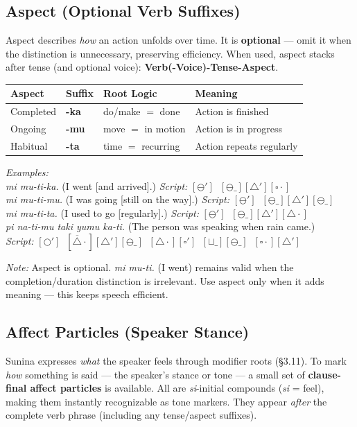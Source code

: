 \documentclass[12pt, a4paper]{article}
\begin{document}
\subsection{Aspect (Optional Verb Suffixes)}
Aspect describes \textit{how} an action unfolds over time. It is \textbf{optional} --- omit it when the distinction is unnecessary, preserving efficiency. When used, aspect stacks after tense (and optional voice): \textbf{Verb(-Voice)-Tense-Aspect}.

\vspace{0.5em}
\begin{tabular}{@{}llll@{}}
\toprule
\textbf{Aspect} & \textbf{Suffix} & \textbf{Root Logic} & \textbf{Meaning} \\ \midrule
Completed & \textbf{-ka} & do/make $=$ done & Action is finished \\
Ongoing & \textbf{-mu} & move $=$ in motion & Action is in progress \\
Habitual & \textbf{-ta} & time $=$ recurring & Action repeats regularly \\
\bottomrule
\end{tabular}

\vspace{0.5em}
\noindent\textit{Examples:} \\
\textit{mi mu-ti-ka.} \quad (I went [and arrived].) \quad
\textit{Script:} $[\ominus'] \;\; [\ominus\_][\triangle'][\square\cdot]$ \\
\textit{mi mu-ti-mu.} \quad (I was going [still on the way].) \quad
\textit{Script:} $[\ominus'] \;\; [\ominus\_][\triangle'][\ominus\_]$ \\
\textit{mi mu-ti-ta.} \quad (I used to go [regularly].) \quad
\textit{Script:} $[\ominus'] \;\; [\ominus\_][\triangle'][\triangle\cdot]$ \\
\textit{pi na-ti-mu taki yumu ka-ti.} \quad (The person was speaking when rain came.) \\
\textit{Script:} $[\bigcirc'] \;\; [\overline{\triangle}\cdot][\triangle'][\ominus\_] \;\; [\triangle\cdot][\square'] \;\; [\sqcup\_][\ominus\_] \;\; [\square\cdot][\triangle']$

\vspace{0.3em}
\textit{Note:} Aspect is optional. \textit{mi mu-ti.} (I went) remains valid when the completion/duration distinction is irrelevant. Use aspect only when it adds meaning --- this keeps speech efficient.

\subsection{Affect Particles (Speaker Stance)}
Sunina expresses \textit{what} the speaker feels through modifier roots (\S3.11). To mark \textit{how} something is said --- the speaker's stance or tone --- a small set of \textbf{clause-final affect particles} is available. All are \textit{si}-initial compounds (\textit{si} = feel), making them instantly recognizable as tone markers. They appear \textit{after} the complete verb phrase (including any tense/aspect suffixes).
\end{document}
